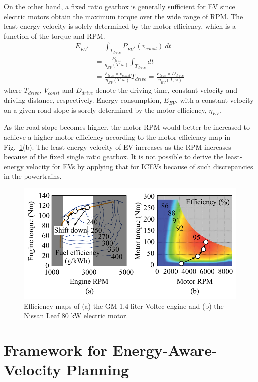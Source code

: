 \documentclass{IEEEtran}
\begin{document}
On the other hand, a fixed ratio gearbox is generally sufficient for EV since electric motors obtain the maximum torque over the wide range of RPM. The least-energy velocity is solely determined by the motor efficiency, which is a function of the torque and RPM. 
%
\begin{align}
E_{EV^*} 	&= \int_{T_{drive}} P_{EV^*}(v_{const})~dt \nonumber\\
		&= \frac{P_{trac}}{\eta_{EV}(T, \omega)} \int_{T_{drive}} dt  \nonumber\\
		&= \frac{F_{trac} \times v_{const}}{\eta_{EV}(T, \omega)} T_{drive}
		= \frac{F_{trac} \times D_{drive}}{\eta_{EV}(T, \omega)} \nonumber
\end{align}
where $T_{drive}$, $V_{const}$ and $D_{drive}$ denote the driving time, constant velocity and driving distance, respectively. Energy consumption, $E_{EV}$, with a constant velocity on a given road slope is sorely determined by the motor efficiency, $\eta_{EV}$. 

As the road slope becomes higher, the motor RPM would better be increased to achieve a higher motor efficiency according to the motor efficiency map in Fig.~\ref{fig:efficiency_map}(b). The least-energy velocity of EV increases as the RPM increases because of the fixed single ratio gearbox. It is not possible to derive the least-energy velocity for EVs by applying that for ICEVs because of such discrepancies in the powertrains.

\begin{figure}	%
\includegraphics[width=1.0\hsize]{Figures/efficiency_maps.pdf}
\caption{Efficiency maps of (a) the GM 1.4 liter Voltec engine and (b) the Nissan Leaf 80 kW electric motor.}
\label{fig:efficiency_map}
\end{figure} 

\section{Framework for Energy-Aware-Velocity Planning} \label{sec:framework}
\end{document}
